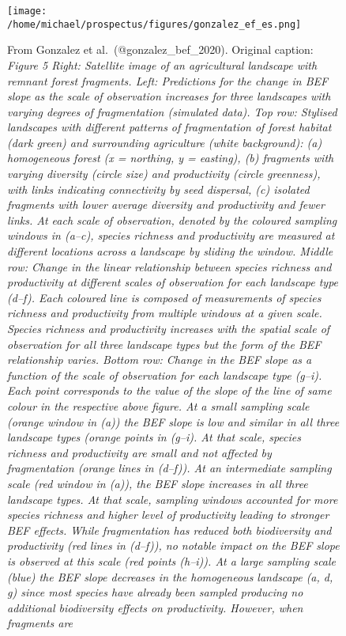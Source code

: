 \begin{figure}
\centering
\texttt{[image: /home/michael/prospectus/figures/gonzalez\_ef\_es.png]}
\caption{From Gonzalez et al.~(@gonzalez\_bef\_2020). Original caption:
\emph{Figure 5 Right: Satellite image of an agricultural landscape with
remnant forest fragments. Left: Predictions for the change in BEF slope
as the scale of observation increases for three landscapes with varying
degrees of fragmentation (simulated data). Top row: Stylised landscapes
with different patterns of fragmentation of forest habitat (dark green)
and surrounding agriculture (white background): (a) homogeneous forest
(x = northing, y = easting), (b) fragments with varying diversity
(circle size) and productivity (circle greenness), with links indicating
connectivity by seed dispersal, (c) isolated fragments with lower
average diversity and productivity and fewer links. At each scale of
observation, denoted by the coloured sampling windows in (a--c), species
richness and productivity are measured at different locations across a
landscape by sliding the window. Middle row: Change in the linear
relationship between species richness and productivity at different
scales of observation for each landscape type (d--f). Each coloured line
is composed of measurements of species richness and productivity from
multiple windows at a given scale. Species richness and productivity
increases with the spatial scale of observation for all three landscape
types but the form of the BEF relationship varies. Bottom row: Change in
the BEF slope as a function of the scale of observation for each
landscape type (g--i). Each point corresponds to the value of the slope
of the line of same colour in the respective above figure. At a small
sampling scale (orange window in (a)) the BEF slope is low and similar
in all three landscape types (orange points in (g--i). At that scale,
species richness and productivity are small and not affected by
fragmentation (orange lines in (d--f)). At an intermediate sampling
scale (red window in (a)), the BEF slope increases in all three
landscape types. At that scale, sampling windows accounted for more
species richness and higher level of productivity leading to stronger
BEF effects. While fragmentation has reduced both biodiversity and
productivity (red lines in (d--f)), no notable impact on the BEF slope
is observed at this scale (red points (h--i)). At a large sampling scale
(blue) the BEF slope decreases in the homogeneous landscape (a, d, g)
since most species have already been sampled producing no additional
biodiversity effects on productivity. However, when fragments are
}}
\end{figure}
